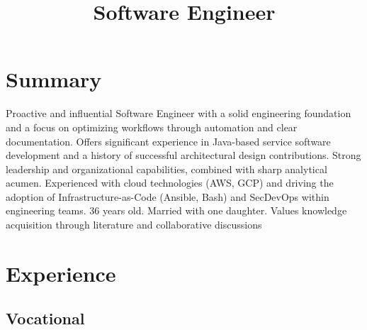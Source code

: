 \documentclass[11pt, a4paper]{moderncv}
\title{Software Engineer}
\begin{document}
\makecvtitle

\section{Summary}
Proactive and influential Software Engineer with a solid engineering foundation and a focus on optimizing workflows through automation and clear documentation. Offers significant experience in Java-based service software development and a history of successful architectural design contributions. Strong leadership and organizational capabilities, combined with sharp analytical acumen. Experienced with cloud technologies (AWS, GCP) and driving the adoption of Infrastructure-as-Code (Ansible, Bash) and SecDevOps within engineering teams. 36 years old. Married with one daughter. Values knowledge acquisition through literature and collaborative discussions

\newpage
\section{Experience}
\subsection{Vocational}
\end{document}
